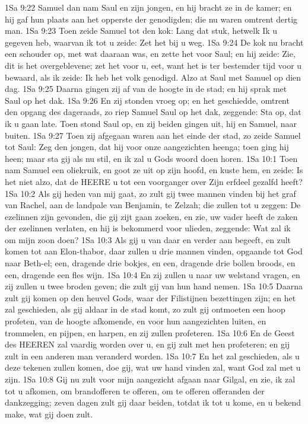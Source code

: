 1Sa 9:22  Samuel dan nam Saul en zijn jongen, en hij bracht ze in de kamer; en hij gaf hun plaats aan het opperste der genodigden; die nu waren omtrent dertig man.
1Sa 9:23  Toen zeide Samuel tot den kok: Lang dat stuk, hetwelk Ik u gegeven heb, waarvan ik tot u zeide: Zet het bij u weg.
1Sa 9:24  De kok nu bracht een schouder op, met wat daaraan was, en zette het voor Saul; en hij zeide: Zie, dit is het overgeblevene; zet het voor u, eet, want het is ter bestemder tijd voor u bewaard, als ik zeide: Ik heb het volk genodigd. Alzo at Saul met Samuel op dien dag.
1Sa 9:25  Daarna gingen zij af van de hoogte in de stad; en hij sprak met Saul op het dak.
1Sa 9:26  En zij stonden vroeg op; en het geschiedde, omtrent den opgang des dageraads, zo riep Samuel Saul op het dak, zeggende: Sta op, dat ik u gaan late. Toen stond Saul op, en zij beiden gingen uit, hij en Samuel, naar buiten.
1Sa 9:27  Toen zij afgegaan waren aan het einde der stad, zo zeide Samuel tot Saul: Zeg den jongen, dat hij voor onze aangezichten heenga; toen ging hij heen; maar sta gij als nu stil, en ik zal u Gods woord doen horen.
1Sa 10:1  Toen nam Samuel een oliekruik, en goot ze uit op zijn hoofd, en kuste hem, en zeide: Is het niet alzo, dat de HEERE u tot een voorganger over Zijn erfdeel gezalfd heeft?
1Sa 10:2  Als gij heden van mij gaat, zo zult gij twee mannen vinden bij het graf van Rachel, aan de landpale van Benjamin, te Zelzah; die zullen tot u zeggen: De ezelinnen zijn gevonden, die gij zijt gaan zoeken, en zie, uw vader heeft de zaken der ezelinnen verlaten, en hij is bekommerd voor ulieden, zeggende: Wat zal ik om mijn zoon doen?
1Sa 10:3  Als gij u van daar en verder aan begeeft, en zult komen tot aan Elon-thabor, daar zullen u drie mannen vinden, opgaande tot God naar Beth-el; een, dragende drie bokjes, en een, dragende drie bollen broods, en een, dragende een fles wijn.
1Sa 10:4  En zij zullen u naar uw welstand vragen, en zij zullen u twee broden geven; die zult gij van hun hand nemen.
1Sa 10:5  Daarna zult gij komen op den heuvel Gods, waar der Filistijnen bezettingen zijn; en het zal geschieden, als gij aldaar in de stad komt, zo zult gij ontmoeten een hoop profeten, van de hoogte afkomende, en voor hun aangezichten luiten, en trommelen, en pijpen, en harpen, en zij zullen profeteren.
1Sa 10:6  En de Geest des HEEREN zal vaardig worden over u, en gij zult met hen profeteren; en gij zult in een anderen man veranderd worden.
1Sa 10:7  En het zal geschieden, als u deze tekenen zullen komen, doe gij, wat uw hand vinden zal, want God zal met u zijn.
1Sa 10:8  Gij nu zult voor mijn aangezicht afgaan naar Gilgal, en zie, ik zal tot u afkomen, om brandofferen te offeren, om te offeren offeranden der dankzegging; zeven dagen zult gij daar beiden, totdat ik tot u kome, en u bekend make, wat gij doen zult.
